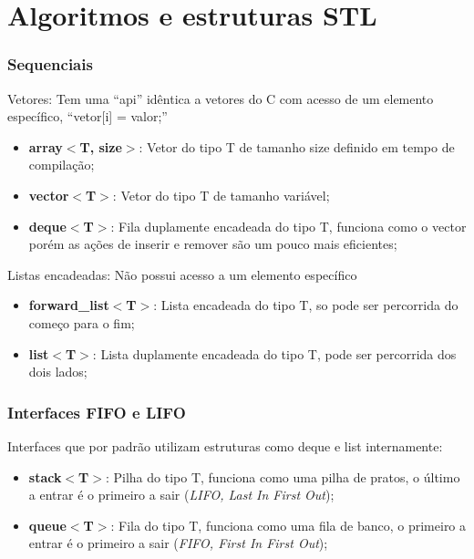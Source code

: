 \documentclass[12pt]{beamer}
\begin{document}
\section{Algoritmos e estruturas STL}
\begin{frame}[allowframebreaks]
    \frametitle{Sequenciais}

    Vetores:
    Tem uma ``api'' idêntica a vetores do C com acesso de um elemento específico, ``vetor[i] = valor;''

    \begin{itemize}
        \item\textbf{array$<$T, size$>$}: Vetor do tipo T de tamanho size definido em tempo de compilação;
        \item\textbf{vector$<$T$>$}: Vetor do tipo T de tamanho variável;
        \item \textbf{deque$<$T$>$}: Fila duplamente encadeada do tipo T, funciona como o vector porém as ações de inserir e remover são um pouco mais eficientes;
    \end{itemize}

    \framebreak

    Listas encadeadas: Não possui acesso a um elemento específico
    \begin{itemize}
        \item\textbf{forward\_list$<$T$>$}: Lista encadeada do tipo T, so pode ser percorrida do começo para o fim;
        \item\textbf{list$<$T$>$}: Lista duplamente encadeada do tipo T, pode ser percorrida dos dois lados;
    \end{itemize}
\end{frame}

\begin{frame}
    \frametitle{Interfaces FIFO e LIFO}

    Interfaces que por padrão utilizam estruturas como deque e list internamente:

    \begin{itemize}
        \item\textbf{stack$<$T$>$}: Pilha do tipo T, funciona como uma pilha de pratos, o último a entrar é o primeiro a sair (\textit{LIFO, Last In First Out});
        \item\textbf{queue$<$T$>$}: Fila do tipo T, funciona como uma fila de banco, o primeiro a entrar é o primeiro a sair (\textit{FIFO, First In First Out});
    \end{itemize}

\end{frame}
\end{document}
